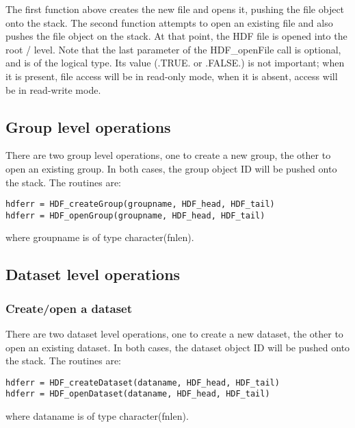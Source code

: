 \documentclass[DIV=calc, paper=letter, fontsize=11pt]{scrartcl}	 %
\begin{document}
The first function above creates the new file and opens it, pushing the file object onto the stack.  The second function
attempts to open an existing file and also pushes the file object on the stack.  At that point, the HDF file is opened into
the root \textsf{/} level.  Note that the last parameter of the \textsf{HDF\_openFile} call is optional, and is of the \textsf{logical} type.
Its value (.TRUE. or .FALSE.) is not important; when it is present, file access will be in read-only mode, when it is absent, access will be in read-write mode.

\subsection{Group level operations}
There are two group level operations, one to create a new group, the other to open an existing group. In both cases, the group object ID will
be pushed onto the stack.  The routines are:
\begin{verbatim}
hdferr = HDF_createGroup(groupname, HDF_head, HDF_tail)
hdferr = HDF_openGroup(groupname, HDF_head, HDF_tail)
\end{verbatim}
where \textsf{groupname} is of type \textsf{character(fnlen)}.

\subsection{Dataset level operations}

\subsubsection{Create/open a dataset}
There are two dataset level operations, one to create a new dataset, the other to open an existing dataset. In both cases, the dataset object ID will
be pushed onto the stack.  The routines are:
\begin{verbatim}
hdferr = HDF_createDataset(dataname, HDF_head, HDF_tail)
hdferr = HDF_openDataset(dataname, HDF_head, HDF_tail)
\end{verbatim}
where \textsf{dataname} is of type \textsf{character(fnlen)}.
\end{document}
